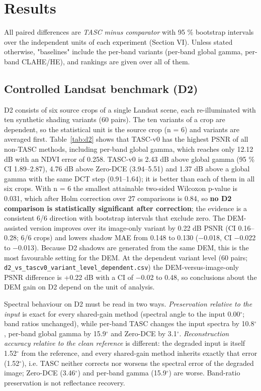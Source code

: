 \documentclass[conference]{IEEEtran}
\begin{document}
\section{Results}
All paired differences are \emph{TASC minus comparator} with 95 \% bootstrap intervals over the independent units of each experiment (Section VI). Unless stated otherwise, "baselines" include the per-band variants (per-band global gamma, per-band CLAHE/HE), and rankings are given over all of them.

\subsection{Controlled Landsat benchmark (D2)}
D2 consists of six source crops of a single Landsat scene, each re-illuminated with ten synthetic shading variants (60 pairs). The ten variants of a crop are dependent, so the statistical unit is the source crop (n = 6) and variants are averaged first. Table~\ref{tab:d2} shows that TASC-v0 has the highest PSNR of all non-TASC methods, including per-band global gamma, which reaches only 12.12 dB with an NDVI error of 0.258. TASC-v0 is 2.43 dB above global gamma (95 \% CI 1.89--2.87), 4.76 dB above Zero-DCE (3.94--5.51) and 1.37 dB above a global gamma with the same DCT step (0.91--1.64); it is better than each of them in all six crops. With n = 6 the smallest attainable two-sided Wilcoxon p-value is 0.031, which after Holm correction over 27 comparisons is 0.84, so \textbf{no D2 comparison is statistically significant after correction}; the evidence is a consistent 6/6 direction with bootstrap intervals that exclude zero. The DEM-assisted version improves over its image-only variant by 0.22 dB PSNR (CI 0.16--0.28; 6/6 crops) and lowers shadow MAE from 0.148 to 0.130 ($-$0.018, CI $-$0.022 to $-$0.013). Because D2 shadows are generated from the same DEM, this is the most favourable setting for the DEM. At the dependent variant level (60 pairs; \texttt{d2\_vs\_tascv0\_variant\_level\_dependent.csv}) the DEM-versus-image-only PSNR difference is +0.22 dB with a CI of $-$0.02 to 0.48, so conclusions about the DEM gain on D2 depend on the unit of analysis.

Spectral behaviour on D2 must be read in two ways. \emph{Preservation relative to the input} is exact for every shared-gain method (spectral angle to the input 0.00$^{\circ}$; band ratios unchanged), while per-band TASC changes the input spectra by 10.8$^{\circ}$, per-band global gamma by 15.9$^{\circ}$ and Zero-DCE by 3.1$^{\circ}$. \emph{Reconstruction accuracy relative to the clean reference} is different: the degraded input is itself 1.52$^{\circ}$ from the reference, and every shared-gain method inherits exactly that error (1.52$^{\circ}$), i.e. TASC neither corrects nor worsens the spectral error of the degraded image; Zero-DCE (3.46$^{\circ}$) and per-band gamma (15.9$^{\circ}$) are worse. Band-ratio preservation is not reflectance recovery.
\end{document}

